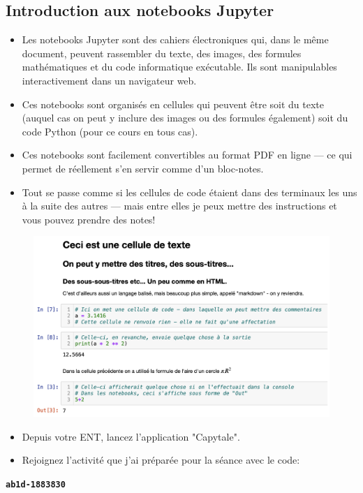\documentclass[12pt]{article}
\begin{document}
	\subsection{Introduction aux notebooks Jupyter}
	\begin{itemize}
		\item Les notebooks Jupyter sont des cahiers électroniques qui, dans le même document, peuvent rassembler du texte, des images, des formules mathématiques et du code informatique exécutable. Ils sont manipulables interactivement dans un navigateur web.
		\item Ces notebooks sont organisés en cellules qui peuvent être soit du texte (auquel cas on peut y inclure des images ou des formules également) soit du code Python (pour ce cours en tous cas).
		\item Ces notebooks sont facilement convertibles au format PDF en ligne --- ce qui permet de réellement s'en servir comme d'un bloc-notes.
		\item Tout se passe comme si les cellules de code étaient dans des terminaux les uns à la suite des autres --- mais entre elles je peux mettre des instructions et vous pouvez prendre des notes!
	\end{itemize}

	\begin{figure}[H]
		\centering
		\includegraphics[width=\textwidth]{006_Jupyter.png}
	\end{figure}
	
	\begin{tcolorbox}[colframe=red!75!black, boxrule=2pt]
		\begin{minipage}{1\textwidth}
			\begin{itemize}				
				\item Depuis votre ENT, lancez l'application "Capytale".
				\item Rejoignez l'activité que j'ai préparée pour la séance avec le code:
			\end{itemize}
			\centering
			\textbf{\texttt{ab1d-1883830}}
		\end{minipage}
	\end{tcolorbox}
	\leavevmode
	\\
	
\end{document}
